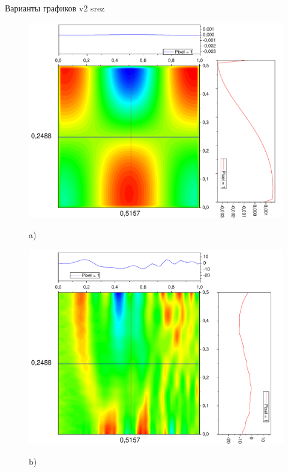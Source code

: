 \documentclass[a4paper,12pt]{article}
\begin{document}
Варианты графиков v2 srez
\begin{figure}[h!]
	\begin{center}
		\begin{minipage}[h]{0.24\linewidth}
			\includegraphics[width=\textwidth]{graphs/graphs_l/v2/wave_t-0_v2_srez} \begin{center}	a)	\end{center}
		\end{minipage}
		\begin{minipage}[h]{0.24\linewidth}
			\includegraphics[width=\textwidth]{graphs/graphs_l/v2/wave_t-8_v2_srez} \begin{center}	b)	\end{center}

\end{minipage}
\end{center}
\end{figure}
\end{document}
